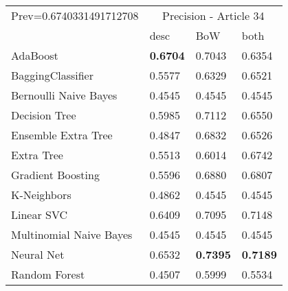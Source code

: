 \begin{tabular}{|l|l|l|l| }
\hline
Prev=0.6740331491712708 &  \multicolumn{3}{c|}{Precision - Article 34} \\
\cline{2-4} & desc & BoW & both \\ \hline
AdaBoost                & {\bf 0.6704} & 0.7043 & 0.6354\\
BaggingClassifier       & 0.5577 & 0.6329 & 0.6521\\
Bernoulli Naive Bayes   & 0.4545 & 0.4545 & 0.4545\\
Decision Tree           & 0.5985 & 0.7112 & 0.6550\\
Ensemble Extra Tree     & 0.4847 & 0.6832 & 0.6526\\
Extra Tree              & 0.5513 & 0.6014 & 0.6742\\
Gradient Boosting       & 0.5596 & 0.6880 & 0.6807\\
K-Neighbors             & 0.4862 & 0.4545 & 0.4545\\
Linear SVC              & 0.6409 & 0.7095 & 0.7148\\
Multinomial Naive Bayes & 0.4545 & 0.4545 & 0.4545\\
Neural Net              & 0.6532 & {\bf 0.7395} & {\bf 0.7189}\\
Random Forest           & 0.4507 & 0.5999 & 0.5534\\
\hline
\end{tabular}